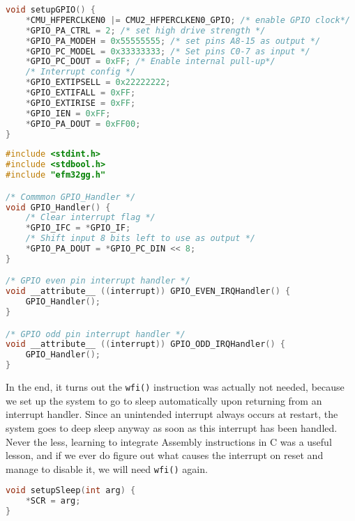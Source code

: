 \begin{minipage}{\linewidth}
\begin{lstlisting}[language=C, label=EX1-C-gpio, caption=gpio.c]
void setupGPIO() { 
    *CMU_HFPERCLKEN0 |= CMU2_HFPERCLKEN0_GPIO; /* enable GPIO clock*/
    *GPIO_PA_CTRL = 2; /* set high drive strength */
    *GPIO_PA_MODEH = 0x55555555; /* set pins A8-15 as output */
    *GPIO_PC_MODEL = 0x33333333; /* Set pins C0-7 as input */
    *GPIO_PC_DOUT = 0xFF; /* Enable internal pull-up*/
    /* Interrupt config */
    *GPIO_EXTIPSELL = 0x22222222;
    *GPIO_EXTIFALL = 0xFF;
    *GPIO_EXTIRISE = 0xFF;
    *GPIO_IEN = 0xFF;
    *GPIO_PA_DOUT = 0xFF00;
}
\end{lstlisting}
\end{minipage}

\begin{minipage}{\linewidth}
\begin{lstlisting}[language=C, label=EX1-C-interrupt-handler, caption=interrupt\_handlers.c]
#include <stdint.h>
#include <stdbool.h>
#include "efm32gg.h"

/* Commmon GPIO_Handler */
void GPIO_Handler() {
    /* Clear interrupt flag */
    *GPIO_IFC = *GPIO_IF;
    /* Shift input 8 bits left to use as output */
    *GPIO_PA_DOUT = *GPIO_PC_DIN << 8;
}

/* GPIO even pin interrupt handler */
void __attribute__ ((interrupt)) GPIO_EVEN_IRQHandler() {
    GPIO_Handler();
}

/* GPIO odd pin interrupt handler */
void __attribute__ ((interrupt)) GPIO_ODD_IRQHandler() {
    GPIO_Handler();
}
\end{lstlisting}
\end{minipage}

In the end, it turns out the \texttt{wfi()} instruction was actually not needed, because we set up the system to go to sleep automatically upon returning from an interrupt handler. Since an unintended interrupt always occurs at restart, the system goes to deep sleep anyway as soon as this interrupt has been handled. Never the less, learning to integrate Assembly instructions in C was a useful lesson, and if we ever do figure out what causes the interrupt on reset and manage to disable it, we will need \texttt{wfi()} again.

\begin{minipage}{\linewidth}
\begin{lstlisting}[language=C, label=EX1-C-interrupt-handler, caption=Writing 1 to the second bit of the System Control Register enables automatic sleep on return from interrupt handlers.]
void setupSleep(int arg) {
    *SCR = arg;
}
\end{lstlisting}
\end{minipage}


